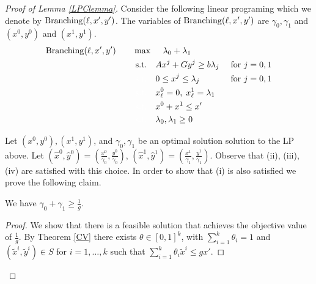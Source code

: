 \begin{proof}[Proof of Lemma \ref{LPClemma}] 
	
	Consider the following linear programing which we denote by $\operatorname{Branching}(\ell,x',y')$. The variables of $\operatorname{Branching}(\ell,x',y')$ are $\gamma_0,\gamma_1$ and $(x^0,y^0)$ and $(x^1,y^1)$. 
	\begin{align}
	\LPC(\ell,x',y')\quad\quad& \max\quad \;\lambda_0+\lambda_1\\
	&\;\text{s.t.} \quad Ax^j + Gy^j\geq b\lambda_j & \mbox{ for $j=0,1$} \label{feasibility}\\
	&\;{\color{white}{\text{s.t.}} }\quad 0 \leq x^j \leq \lambda_j &\mbox{ for $j=0,1$}\label{bound}\\
	&\;{\color{white}{\text{s.t.}} }\quad x^0_\ell = 0,\; x^1_\ell =\lambda_1\label{branchcoordinate}\\
	&\;{\color{white}{\text{s.t.}} }\quad x^0 + x^1 \leq x'\label{packing}\\
	&\;{\color{white}{\text{s.t.}} }\quad \lambda_0,\lambda_1 \geq 0
	\end{align}
	
	Let $(x^0,y^0),(x^1,y^1)$, and $\gamma_0,\gamma_1$ be an optimal solution solution to the LP above. Let $(\hat{x}^0,\hat{y}^0) = (\frac{x^0}{\gamma_0},\frac{y^0}{\gamma_0})$, $(\hat{x}^1,\hat{y}^1) = (\frac{x^1}{\gamma_1},\frac{y^1}{\gamma_1})$. Observe that  (ii), (iii), (iv) are satisfied with this choice. In order to show that (i) is also satisfied we prove the following claim.
	
	\begin{claim}\label{CVexists}
		We have $\gamma_0 + \gamma_1\geq \frac{1}{g}$.
	\end{claim}
\begin{proof}
We show that there is a feasible solution that achieves the objective value of $\frac{1}{g}$. By Theorem \ref{CV} there exists $\theta \in [0,1]^k$, with $\sum_{i=1}^{k}\theta_i = 1$ and $(\tilde{x}^i,\tilde{y}^i)\in S$ for $i=1,\ldots,k$ such that 
 $\sum_{i=1}^{k}\theta_i \tilde{x}^i\leq gx'$. 
 

\end{proof}
\end{proof}
